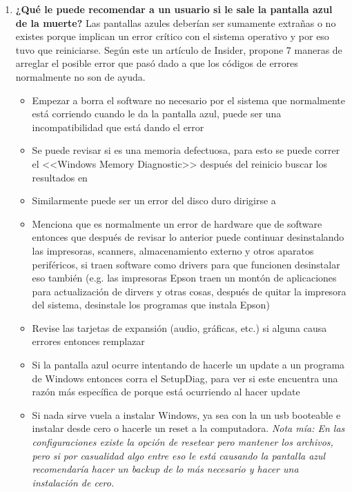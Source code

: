 \documentclass[stu, 12pt, letterpaper, donotrepeattitle, floatsintext, natbib, helv]{apa7}
\begin{document}
\begin{enumerate}
    \item \textbf{¿Qué le puede recomendar a un usuario si le sale la pantalla azul de la muerte?}
    Las pantallas azules deberían ser sumamente extrañas o no existes porque implican un error crítico con el sistema operativo y por eso tuvo que reiniciarse. Según este un artículo de Insider,  propone 7 maneras de arreglar el posible error que pasó dado a que los códigos de errores normalmente no son de ayuda.
    \begin{itemize}
        \item Empezar a borra el software no necesario por el sistema que normalmente está corriendo cuando le da la pantalla azul, puede ser una incompatibilidad que está dando el error
        \item Se puede revisar si es una memoria defectuosa, para esto se puede correr el <<Windows Memory Diagnostic>> después del reinicio buscar los resultados en 
        \item Similarmente puede ser un error del disco duro dirigirse a 
        \item Menciona que es normalmente un error de hardware que de software entonces que después de revisar lo anterior puede continuar desinstalando las impresoras, scanners, almacenamiento externo y otros aparatos periféricos, si traen software como drivers para que funcionen desinstalar eso también (e.g. las impresoras Epson traen un montón de aplicaciones para actualización de dirvers y otras cosas, después de quitar la impresora del sistema, desinstale los programas que instala Epson)
        \item Revise las tarjetas de expansión (audio, gráficas, etc.) si alguna causa errores entonces remplazar
        \item Si la pantalla azul ocurre intentando de hacerle un update a un programa de Windows entonces corra el SetupDiag, para ver si este encuentra una razón más específica de porque está ocurriendo al hacer update
        \item Si nada sirve vuela a instalar Windows, ya sea con la un usb booteable e instalar desde cero o hacerle un reset a la computadora. \textit{Nota mía: En las configuraciones existe la opción de resetear pero mantener los archivos, pero si por casualidad algo entre eso le está causando la pantalla azul recomendaría hacer un backup de lo más necesario y hacer una instalación de cero.}
    \end{itemize}
    

\end{enumerate}
\end{document}
